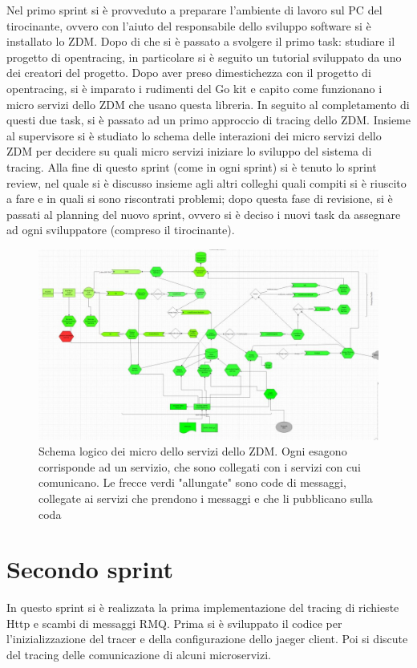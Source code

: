 \documentclass[a4paper,12pt,titlepage,italian,openany]{report}
\begin{document}
Nel primo sprint si è provveduto a preparare l'ambiente di lavoro sul PC del tirocinante, ovvero con l'aiuto del responsabile dello sviluppo software si è installato lo ZDM\cite{zdm:1}. Dopo di che si è passato a svolgere il primo task: studiare il progetto di opentracing, in particolare
si è seguito un tutorial sviluppato da uno dei creatori del progetto. Dopo aver preso dimestichezza con il progetto di opentracing, si è imparato i rudimenti del Go kit e capito come funzionano i micro servizi dello ZDM che usano questa libreria.
In seguito al completamento di questi due task, si è passato ad un primo approccio di tracing dello ZDM.
Insieme al supervisore si è studiato lo schema delle interazioni dei micro servizi dello ZDM\cite{zdm:1} per decidere su quali micro servizi iniziare lo sviluppo del sistema di tracing.
Alla fine di questo sprint (come in ogni sprint) si è tenuto lo sprint review, nel quale si è discusso insieme agli altri colleghi quali compiti si è  riuscito a fare e in quali si sono riscontrati problemi; dopo questa fase di revisione, si è passati al planning del nuovo sprint, ovvero si è deciso i nuovi task da assegnare ad ogni sviluppatore (compreso il tirocinante).
\begin{figure}[H]
    \includegraphics[scale=0.4]{41.jpg}
    \centering
    \caption{Schema logico dei micro dello servizi dello ZDM\cite{zdm:1}. Ogni esagono corrisponde ad un servizio, che sono collegati con i servizi con cui comunicano. Le frecce verdi "allungate" sono code di messaggi, collegate ai servizi che prendono i messaggi e che li pubblicano sulla coda }
\end{figure}  

\newpage
\section{Secondo sprint}
In questo sprint si è realizzata la prima implementazione del tracing di richieste Http e scambi di messaggi RMQ. Prima si 
è sviluppato il codice per l'inizializzazione del tracer e della configurazione dello jaeger client. Poi si discute del tracing delle comunicazione di alcuni microservizi.
\end{document}
